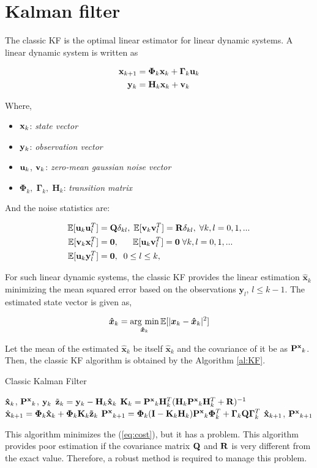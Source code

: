 \section{Kalman filter\label{sec: kf}}

The classic KF is the optimal linear estimator for linear dynamic systems. A linear dynamic system is written as

\begin{align}
{\bf x}_{k+1} &= \bm{\Phi}_k{\bf x}_{k} + \bm{\Gamma}_k{\bf u}_{k}\\
{\bf y}_{k} &= {\bf H}_k{\bf x}_{k} + {\bf v}_{k}
\end{align}

Where, 
\begin{itemize}
    \item ${\bf x}_k$: {\it state vector}
    \item ${\bf y}_k$: {\it observation vector}
    \item ${\bf u}_k$, ${\bf v}_k$: {\it zero-mean gaussian noise vector}
    \item $\bm{\Phi}_k, \; \bm{\Gamma}_k, \; \bm{H}_k$: {\it transition matrix}
\end{itemize}

And the noise statistics are:

\begin{align}
    \mathbb{E}[{\bf u}_k{\bf u}_l^T]&={\bf Q}\delta_{kl},\;
    \mathbb{E}[{\bf v}_k{\bf v}_l^T]={\bf R}\delta_{kl},\; \forall k,l=0,1,...\\
    \mathbb{E}[{\bf v}_k{\bf x}_l^T]&={\bf 0},\;\;\;\;\;\;
    \mathbb{E}[{\bf u}_k{\bf v}_l^T]={\bf 0}\; \forall k,l=0,1,...\\
    \mathbb{E}[{\bf u}_k{\bf y}_l^T]&={\bf 0}, \;\; 0\leq l\leq k,
\end{align}

For such linear dynamic systems, the classic KF provides the linear estimation $\bm{\hat x}_k$ minimizing the mean squared error based on the observations $\bm{y}_l$, $l\leq k-1$. The estimated state vector is given as,

\begin{equation} \label{eq:cost}
    \bm{\hat x}_k = \mathop{\rm arg~min}\limits_{\bm{\hat x}_k}\mathbb{E}[|\bm{x}_k-\bm{\hat x}_k|^2]
\end{equation}

Let the mean of the estimated $\bm{\hat x}_k$ be itself $\bm{\hat x}_k$ and the covariance of it be as ${\bf P^x}_{k}$. Then, the classic KF algorithm is obtained by the Algorithm \ref{al:KF}.

\begin{algorithm}[H]
\caption{Classic Kalman Filter}
\begin{algorithmic}[1]
\label{al:KF}
\REQUIRE ${\bf \hat x}_k$, ${\bf P^x}_{k}$, ${\bf y}_k$
\STATE $\tilde {\bf z}_k = {\bf y}_k - {\bf H}_k{\bf \hat x}_k$
\STATE ${\bf K}_k = {\bf P^x}_k{\bf H}^T_k({\bf H}_k{\bf P^x}_k{\bf H}^T_k+{\bf R})^{-1}$
\STATE $\hat{\bf x}_{k+1} = \bm{\Phi}_k{\bf \hat x}_k+\bm{\Phi}_k{\bf K}_k{\bf \tilde z}_k$
\STATE ${\bf P^x}_{k+1} = \bm{\Phi}_k({\bf I}-{\bf K}_k{\bf H}_k){\bf P^x}_k\bm{\Phi}^T_k + \bm{\Gamma}_k{\bf Q}\bm{\Gamma}_k^T$
\ENSURE ${\bf \hat x}_{k+1}$, ${\bf P^x}_{k+1}$
\end{algorithmic}
\end{algorithm}

This algorithm minimizes the (\ref{eq:cost}), but it has a problem. This algorithm provides poor estimation if the covariance matrix ${\bf Q}$ and ${\bf R}$ is very different from the exact value. Therefore, a robust method is required to manage this problem.